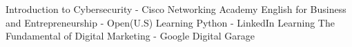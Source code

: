 

\begin{scholarship}
					{Introduction to Cybersecurity  - Cisco Networking Academy }
					{English for Business and Entrepreneurship  - Open(U.S)}
					{Learning Python  - LinkedIn Learning }
					{The Fundamental of Digital Marketing   - Google Digital Garage }
\emptySeparator

\end{scholarship}